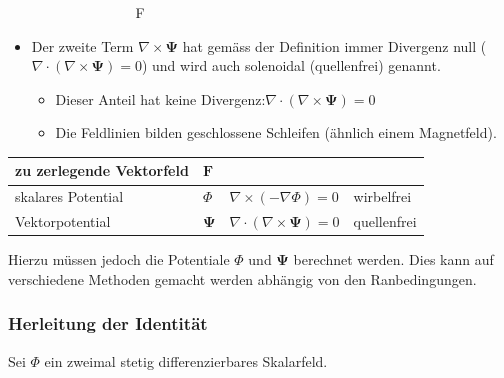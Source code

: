 \begin{itemize}
\begin{itemize}
\begin{figure}[htbp]
\begin{subfigure}{}
        \caption{F}
        \label{fig:senke}
    \end{subfigure}
    \caption{}
    \label{fig:vergleich}
\end{figure}
\end{itemize}
\item Der zweite Term $\nabla \times \mathbf{\Psi}$ hat gemäss der Definition immer Divergenz null ($\nabla \cdot (\nabla \times \mathbf{\Psi}) = 0$) und wird auch solenoidal (quellenfrei) genannt. \newline
\begin{itemize}
\item Dieser Anteil hat keine Divergenz:$\nabla \cdot (\nabla \times \mathbf{\Psi}) = 0$
\item Die Feldlinien bilden geschlossene Schleifen (ähnlich einem Magnetfeld).
\end{itemize}
\end{itemize}


\begin{tabular}[h]{l|l|l|l}
\hline
zu zerlegende Vektorfeld & $\mathbf{F}$ & & \\
\hline 
skalares Potential & $\Phi $ & $\nabla \times (-\nabla \Phi) = 0$ & wirbelfrei\\
\hline
Vektorpotential & $\mathbf{\Psi}$ & $\nabla \cdot (\nabla \times \mathbf{\Psi}) = 0$ & quellenfrei\\
\hline
\end{tabular}\newline

Hierzu müssen jedoch die Potentiale $\Phi $ und $\mathbf{\Psi}$ berechnet werden. Dies kann auf verschiedene Methoden gemacht werden abhängig von den Ranbedingungen.

\subsubsection{Herleitung der Identität}
Sei $\Phi$ ein zweimal stetig differenzierbares Skalarfeld.

